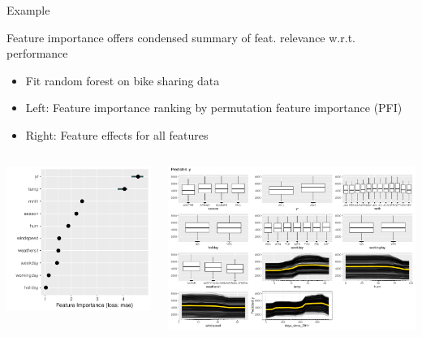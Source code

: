 \documentclass[11pt,compress,t,notes=noshow, aspectratio=169, xcolor=table]{beamer}
\begin{document}
\begin{frame}{Example}

Feature importance offers condensed summary of feat. relevance w.r.t. performance

\medskip

\begin{itemize}
    \item Fit random forest on bike sharing data
    \item Left: Feature importance ranking by permutation feature importance (PFI)
    \item Right: Feature effects for all features
\end{itemize}

\centering
\begin{columns}[c, totalwidth=\textwidth]
  \begin{column}{0.37\textwidth}
\includegraphics[width=.98\linewidth]{figure_man/bike_pfi}
\end{column}
  \begin{column}{0.63\textwidth}
  \includegraphics[width=\linewidth]{figure_man/bike_pdp+ice}

\end{column}
\end{columns}
\end{frame}
\end{document}
